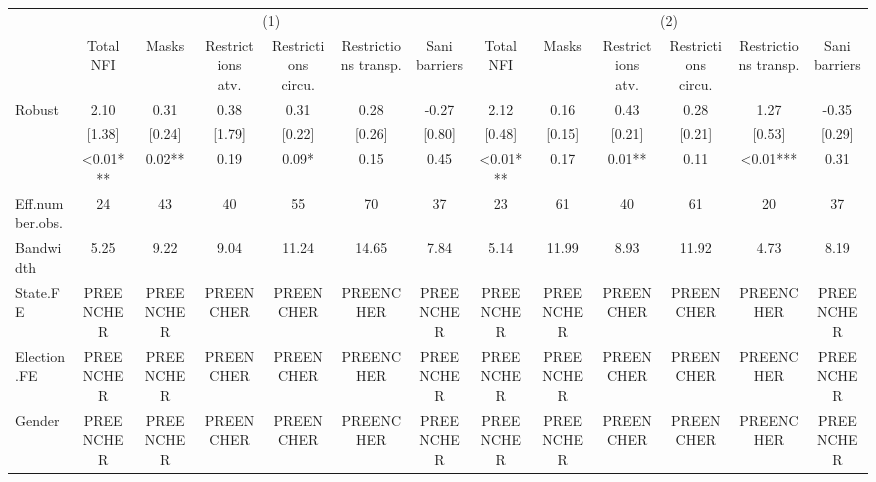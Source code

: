 \begin{table}
\fontsize{12.0pt}{14.4pt}\selectfont
\begin{tabular*}{\linewidth}{@{\extracolsep{\fill}}lcccccccccccc}
\toprule
 & \multicolumn{6}{c}{(1)} & \multicolumn{6}{c}{(2)} \\ 
\cmidrule(lr){2-7} \cmidrule(lr){8-13}
  & Total NFI & Masks & Restrictions atv. & Restrictions circu. & Restrictions transp. & Sani barriers & Total NFI  & Masks  & Restrictions atv.  & Restrictions circu.  & Restrictions transp.  & Sani barriers  \\ 
\midrule\addlinespace[2.5pt]
Robust & 2.10 & 0.31 & 0.38 & 0.31 & 0.28 & -0.27 & 2.12 & 0.16 & 0.43 & 0.28 & 1.27 & -0.35 \\ 
 & [1.38] & [0.24] & [1.79] & [0.22] & [0.26] & [0.80] & [0.48] & [0.15] & [0.21] & [0.21] & [0.53] & [0.29] \\ 
{} & {<0.01***} & {0.02**} & {0.19} & {0.09*} & {0.15} & {0.45} & {<0.01***} & {0.17} & {0.01**} & {0.11} & {<0.01***} & {0.31} \\ 
Eff.number.obs. & 24 & 43 & 40 & 55 & 70 & 37 & 23 & 61 & 40 & 61 & 20 & 37 \\ 
Bandwidth & 5.25 & 9.22 & 9.04 & 11.24 & 14.65 & 7.84 & 5.14 & 11.99 & 8.93 & 11.92 & 4.73 & 8.19 \\ 
State.FE & PREENCHER & PREENCHER & PREENCHER & PREENCHER & PREENCHER & PREENCHER & PREENCHER & PREENCHER & PREENCHER & PREENCHER & PREENCHER & PREENCHER \\ 
Election.FE & PREENCHER & PREENCHER & PREENCHER & PREENCHER & PREENCHER & PREENCHER & PREENCHER & PREENCHER & PREENCHER & PREENCHER & PREENCHER & PREENCHER \\ 
Gender & PREENCHER & PREENCHER & PREENCHER & PREENCHER & PREENCHER & PREENCHER & PREENCHER & PREENCHER & PREENCHER & PREENCHER & PREENCHER & PREENCHER \\ 
\bottomrule
\end{tabular*}
\end{table}

